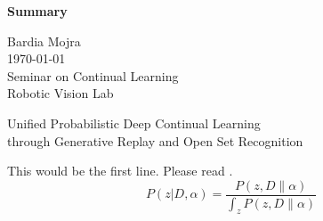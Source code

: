 \documentclass[12pt]{article}
\begin{document}
\begin{center}
\textbf{Summary}\\
\end{center}

\noindent
Bardia Mojra\\
\today\\
Seminar on Continual Learning\\
Robotic Vision Lab\\
\begin{center}
Unified Probabilistic Deep Continual Learning\\
through Generative Replay and Open Set Recognition\\
\end{center}

This would be the first line. Please read \cite{mur2015orb}.\\

$$
P(z | D, \alpha) = \frac{P(z,D\|\alpha)}{\int_{z} P(z,D \| \alpha)}
$$




\end{document}
